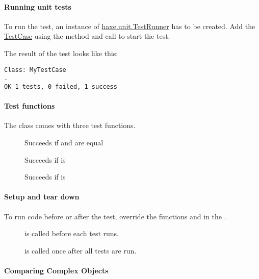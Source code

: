 
\paragraph{Running unit tests}
To run the test, an instance of \href{https://api.haxe.org/haxe/unit/TestRunner.html}{haxe.unit.TestRunner} has to be created. Add the \href{https://api.haxe.org/haxe/unit/TestCase.html}{TestCase} using the  method and call  to start the test.


The result of the test looks like this:
\begin{lstlisting}
Class: MyTestCase
.
OK 1 tests, 0 failed, 1 success
\end{lstlisting} 

\paragraph{Test functions}
The  class comes with three test functions.

\begin{description}
	\item[] Succeeds if  and  are equal
	\item[] Succeeds if  is 
	\item[] Succeeds if  is 
\end{description}

\paragraph{Setup and tear down}

To run code before or after the test, override the functions  and  in the . 

\begin{description}
	\item[] is called before each test runs.
	\item[] is called once after all tests are run.
\end{description}


\paragraph{Comparing Complex Objects}


